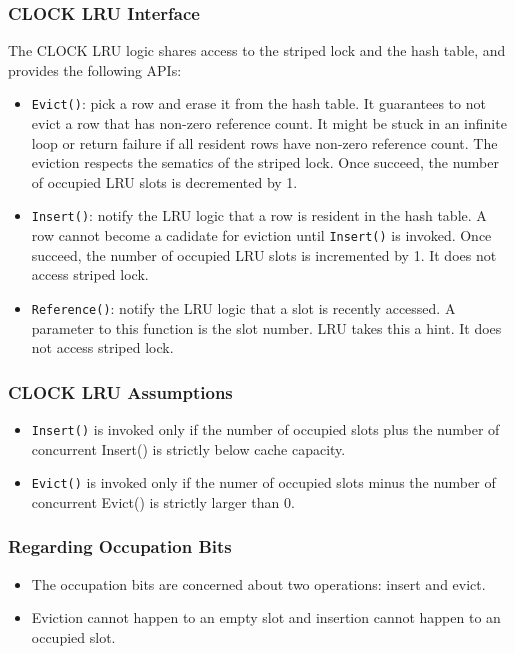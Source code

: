 \documentclass{beamer}
\begin{document}
\begin{frame}
\frametitle{CLOCK LRU Interface}
The CLOCK LRU logic shares access to the striped lock and the hash table, and 
provides the following APIs:

\begin{itemize}
\item \texttt{Evict()}: pick a row and erase it from the hash table. 
  It guarantees to not evict a row that has non-zero reference count. It might
  be stuck in an infinite loop or return failure if all resident rows have non-zero
  reference count. The eviction respects the sematics of the striped lock. Once
  succeed, the number of occupied LRU slots is decremented by 1.
\item \texttt{Insert()}: notify the LRU logic that a row is resident in the 
  hash table. A row cannot become a cadidate for eviction until \texttt{Insert()}
  is invoked. Once succeed, the number of occupied LRU slots is incremented by 1.
  It does not access striped lock.
\item \texttt{Reference()}: notify the LRU logic that a slot is recently accessed.
A parameter to this function is the slot number. LRU takes this a hint. It does 
not access striped lock.
\end{itemize}
\end{frame}

\begin{frame}
\frametitle{CLOCK LRU Assumptions}
\begin{itemize}
\item \texttt{Insert()} is invoked only if the number of occupied slots plus the 
  number of concurrent Insert() is strictly below cache capacity.
\item \texttt{Evict()} is invoked only if the numer of occupied slots minus the 
  number of concurrent Evict() is strictly larger than 0.
\end{itemize}
\end{frame}


\begin{frame}
\frametitle{Regarding Occupation Bits}
\begin{itemize}
\item The occupation bits are concerned about two operations: insert and evict.
\item Eviction cannot happen to an empty slot and insertion cannot happen to an 
occupied slot.
\end{itemize}
\end{frame}
\end{document}
